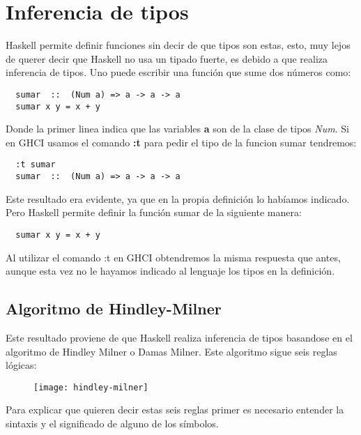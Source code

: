 \section{Inferencia de tipos} %
\label{sec:inferencia_de_tipos}


Haskell permite definir funciones sin decir de que tipos son estas, esto, muy lejos de querer decir que Haskell no usa un tipado fuerte, es debido a que realiza inferencia de tipos.
Uno puede escribir una función que sume dos números como:


\begin{lstlisting}
  sumar  ::  (Num a) => a -> a -> a
  sumar x y = x + y
\end{lstlisting}

Donde la primer linea indica que las variables \textbf{a} son de la clase de tipos \textit{Num}.
Si en GHCI usamos el comando \textbf{:t} para pedir el tipo de la funcion sumar tendremos:


\begin{lstlisting}
  :t sumar
  sumar  ::  (Num a) => a -> a -> a
\end{lstlisting}

Este resultado era evidente, ya que en la propia definición lo habíamos indicado. Pero Haskell permite definir la función sumar de la siguiente manera:

\begin{lstlisting}
  sumar x y = x + y
\end{lstlisting}

Al utilizar el comando :t en GHCI obtendremos la misma respuesta que antes, aunque esta vez no le  hayamos indicado al lenguaje los tipos en la definición.

\subsection{Algoritmo de Hindley-Milner} %

Este resultado proviene de que Haskell realiza inferencia de tipos basandose en el algoritmo de Hindley Milner o Damas Milner.
Este algoritmo sigue seis reglas lógicas:
\begin{figure}[H]
\texttt{[image: hindley-milner]}
\end{figure}

Para explicar que quieren decir estas seis reglas primer es necesario entender la sintaxis y el significado de alguno de los símbolos.

